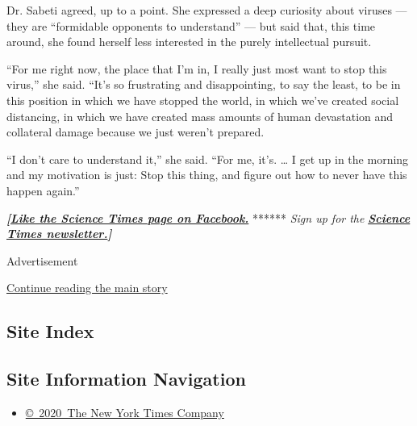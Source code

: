 Dr. Sabeti agreed, up to a point. She expressed a deep curiosity about
viruses --- they are ``formidable opponents to understand'' --- but said
that, this time around, she found herself less interested in the purely
intellectual pursuit.

``For me right now, the place that I'm in, I really just most want to
stop this virus,'' she said. ``It's so frustrating and disappointing, to
say the least, to be in this position in which we have stopped the
world, in which we've created social distancing, in which we have
created mass amounts of human devastation and collateral damage because
we just weren't prepared.

``I don't care to understand it,'' she said. ``For me, it's. \ldots{} I
get up in the morning and my motivation is just: Stop this thing, and
figure out how to never have this happen again.''

\textbf{\emph{{[}}\href{http://on.fb.me/1paTQ1h}{\emph{Like the Science
Times page on Facebook.}}} ****** \emph{\textbar{} Sign up for the}
\textbf{\href{http://nyti.ms/1MbHaRU}{\emph{Science Times
newsletter.}}\emph{{]}}}

Advertisement

\protect\hyperlink{after-bottom}{Continue reading the main story}

\hypertarget{site-index}{%
\subsection{Site Index}\label{site-index}}

\hypertarget{site-information-navigation}{%
\subsection{Site Information
Navigation}\label{site-information-navigation}}

\begin{itemize}
\tightlist
\item
  \href{https://help.nytimes.com/hc/en-us/articles/115014792127-Copyright-notice}{©~2020~The
  New York Times Company}
\end{itemize}

